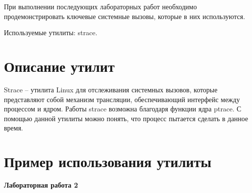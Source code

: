 \documentclass[pdf, unicode, 12pt, a4paper,oneside,fleqn]{article}
\begin{document}
При выполнении последующих лабораторных работ необходимо продемонстрировать 
ключевые системные вызовы, которые в них используются.

Используемые утилиты: strace.

\section{Описание утилит}

Strace \--- утилита Linux для отслеживания системных вызовов, которые представляют собой
механизм трансляции, обеспечивающий интерфейс между процессом и ядром. Работы strace возможна
благодаря функции ядра ptrace. С помощью данной утилиты можно понять, что процесс пытается сделать в данное время.


\section{Пример использования утилиты}

{\large\textbf{Лабораторная работа 2}}
\end{document}
